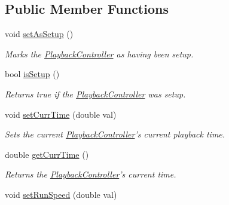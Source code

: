 \subsection*{Public Member Functions}
\begin{DoxyCompactItemize}
\item 
\hypertarget{class_playback_controller_data_aaf1a8d802f8a2e5306f55ad1508c84e5}{void \hyperlink{class_playback_controller_data_aaf1a8d802f8a2e5306f55ad1508c84e5}{set\-As\-Setup} ()}\label{class_playback_controller_data_aaf1a8d802f8a2e5306f55ad1508c84e5}

\begin{DoxyCompactList}\small\item\em Marks the \hyperlink{class_playback_controller}{Playback\-Controller} as having been setup. \end{DoxyCompactList}\item 
\hypertarget{class_playback_controller_data_a9a19a3a519ba730003094e8af7b5feb0}{bool \hyperlink{class_playback_controller_data_a9a19a3a519ba730003094e8af7b5feb0}{is\-Setup} ()}\label{class_playback_controller_data_a9a19a3a519ba730003094e8af7b5feb0}

\begin{DoxyCompactList}\small\item\em Returns true if the \hyperlink{class_playback_controller}{Playback\-Controller} was setup. \end{DoxyCompactList}\item 
\hypertarget{class_playback_controller_data_aa55dc441a5e7b4be9379fb0ada6b52ff}{void \hyperlink{class_playback_controller_data_aa55dc441a5e7b4be9379fb0ada6b52ff}{set\-Curr\-Time} (double val)}\label{class_playback_controller_data_aa55dc441a5e7b4be9379fb0ada6b52ff}

\begin{DoxyCompactList}\small\item\em Sets the current \hyperlink{class_playback_controller}{Playback\-Controller}'s current playback time. \end{DoxyCompactList}\item 
\hypertarget{class_playback_controller_data_af1a1b1775d67dbe5d9ab90e52ef68525}{double \hyperlink{class_playback_controller_data_af1a1b1775d67dbe5d9ab90e52ef68525}{get\-Curr\-Time} ()}\label{class_playback_controller_data_af1a1b1775d67dbe5d9ab90e52ef68525}

\begin{DoxyCompactList}\small\item\em Returns the \hyperlink{class_playback_controller}{Playback\-Controller}'s current time. \end{DoxyCompactList}\item 
\hypertarget{class_playback_controller_data_af0c0614773702172300b1884083c49e3}{void \hyperlink{class_playback_controller_data_af0c0614773702172300b1884083c49e3}{set\-Run\-Speed} (double val)}\label{class_playback_controller_data_af0c0614773702172300b1884083c49e3}


\end{DoxyCompactItemize}

